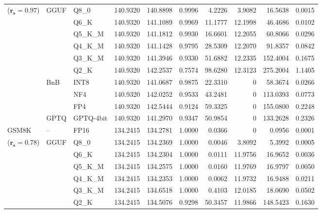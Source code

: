 \begin{table}[t]
{\begin{tabular}{ll l rrrrrrr}
{\scriptsize ($\mathbf{r_s{=}0.97}$)} & GGUF & Q8\_0 & 140.9320 & 140.8898 & 0.9996 & 4.2226 & 3.9082 & 16.5638 & 0.0015 \\
 &  & Q6\_K & 140.9320 & 141.1089 & 0.9969 & 11.1777 & 12.1998 & 46.4686 & 0.0102 \\
 &  & Q5\_K\_M & 140.9320 & 141.1812 & 0.9930 & 16.6601 & 12.2055 & 60.8066 & 0.0296 \\
 &  & Q4\_K\_M & 140.9320 & 141.1428 & 0.9795 & 28.5309 & 12.2070 & 91.8357 & 0.0842 \\
 &  & Q3\_K\_M & 140.9320 & 141.3946 & \cellcolor{red!14}0.9330 & \cellcolor{red!14}51.6882 & 12.2335 & \cellcolor{red!14}152.4004 & \cellcolor{red!14}0.1675 \\
 &  & Q2\_K & 140.9320 & 142.2537 & \cellcolor{red!24}0.7574 & \cellcolor{red!24}98.6280 & 12.3123 & \cellcolor{red!24}275.2004 & \cellcolor{red!24}1.1405 \\
 & BnB & INT8 & 140.9320 & 141.0687 & 0.9875 & 22.3310 & \cellcolor{cyan!10}$0$ & 58.3674 & 0.0266 \\
 &  & NF4 & 140.9320 & 142.0252 & 0.9533 & 43.2481 & \cellcolor{cyan!10}$0$ & 113.0393 & 0.0773 \\
 &  & FP4 & 140.9320 & 142.5444 & \cellcolor{red!14}0.9124 & \cellcolor{red!14}59.3325 & \cellcolor{cyan!10}$0$ & \cellcolor{red!14}155.0800 & \cellcolor{red!14}0.2248 \\
 & GPTQ & GPTQ-4bit & 140.9320 & 141.2970 & \cellcolor{red!14}0.9347 & \cellcolor{red!14}50.9854 & \cellcolor{cyan!10}$0$ & \cellcolor{red!14}133.2628 & \cellcolor{red!14}0.2326 \\
\midrule
GSM8K & -- & FP16 & 134.2415 & 134.2781 & 1.0000 & 0.0366 & \cellcolor{cyan!10}$0$ & 0.0956 & 0.0001 \\
{\scriptsize ($\mathbf{r_s{=}0.78}$)} & GGUF & Q8\_0 & 134.2415 & 134.2369 & 1.0000 & 0.0046 & 3.8092 & 5.3992 & 0.0005 \\
 &  & Q6\_K & 134.2415 & 134.2304 & 1.0000 & 0.0111 & 11.9756 & 16.9652 & 0.0036 \\
 &  & Q5\_K\_M & 134.2415 & 134.2575 & 1.0000 & 0.0160 & 11.9769 & 16.9797 & 0.0050 \\
 &  & Q4\_K\_M & 134.2415 & 134.2353 & 1.0000 & 0.0062 & 11.9732 & 16.9488 & 0.0211 \\
 &  & Q3\_K\_M & 134.2415 & 134.6518 & 1.0000 & 0.4103 & 12.0185 & 18.0690 & 0.0502 \\
 &  & Q2\_K & 134.2415 & 134.5076 & \cellcolor{red!14}0.9298 & \cellcolor{red!14}50.3457 & 11.9866 & \cellcolor{red!14}148.5423 & \cellcolor{red!14}0.1630 \\

\end{tabular}}
\end{table}
